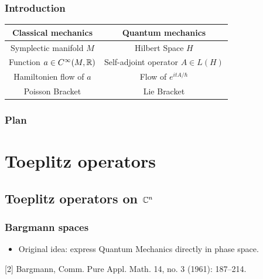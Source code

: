 \documentclass[mathserif]{beamer}
\newcommand{\spline}{\hline}
\begin{document}
\begin{frame}\frametitle{Introduction}
\begin{center}
	\begin{tabular}{|c|c|}
		\spline
	    Classical mechanics & Quantum mechanics\\
		\spline
		Symplectic manifold $M$ & Hilbert Space $H$\\ 
		\spline 
		Function $a\in C^{\infty}(M,\mathbb{R})$ & Self-adjoint
                                                   operator $A\in L(H)$\\
		\spline
                Hamiltonien flow of $a$ & Flow of $e^{itA/\hbar}$\\
		\spline
		Poisson Bracket & Lie Bracket\\
		\spline
	\end{tabular}\end{center}\vspace{0em}
	\begin{itemize}
	\end{itemize}
\end{frame}

\AtBeginSection
{
	\begin{frame}
		\frametitle{Plan}
		\tableofcontents[currentsection]
	\end{frame}
	
}

\section{Toeplitz operators}
\subsection{Toeplitz operators on $\mathbb{C}^n$}
\begin{frame}
  \frametitle{Bargmann spaces}
  \begin{itemize}
  \item Original idea: express Quantum Mechanics directly in phase
    space.
  \vspace{-2em}
  \end{itemize}
\vspace{-1em}
\footnotesize{[2] Bargmann, Comm. Pure Appl. Math. 14, no. 3 (1961): 187–214.}

\end{frame}
\end{document}
